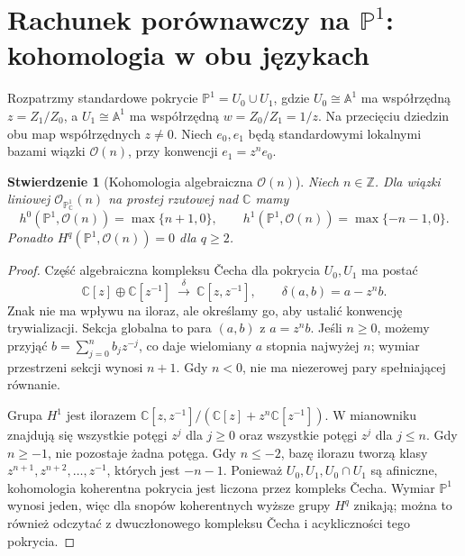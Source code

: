 \documentclass[11pt,a4paper,openany]{report}
\numberwithin{equation}{section}
\theoremstyle{plain}
\newtheorem{stwierdzenie}[twierdzenie]{Stwierdzenie}
\theoremstyle{definition}
\theoremstyle{remark}
\newcommand{\Z}{\mathbb Z}
\newcommand{\C}{\mathbb C}
\newcommand{\A}{\mathbb A}
\newcommand{\PP}{\mathbb P}
\begin{document}
\section[Rachunek porównawczy na P1: kohomologia w obu językach]{Rachunek porównawczy na $\PP^1$: kohomologia w obu językach}
\label{sec:ga9-p1-cech}

Rozpatrzmy standardowe pokrycie $\PP^1=U_0\cup U_1$,
gdzie $U_0\cong\A^1$ ma współrzędną $z=Z_1/Z_0$,
a $U_1\cong\A^1$ ma współrzędną $w=Z_0/Z_1=1/z$.
Na przecięciu dziedzin obu map współrzędnych $z\ne0$.
Niech $e_0,e_1$ będą standardowymi lokalnymi bazami
wiązki $\mathcal O(n)$, przy konwencji $e_1=z^n e_0$.

\begin{stwierdzenie}[Kohomologia algebraiczna $\mathcal O(n)$]
\label{st:ga9-p1-coh}
Niech $n\in\Z$. Dla wiązki liniowej $\mathcal O_{\PP^1_\C}(n)$
na prostej rzutowej nad $\C$ mamy
\[
 h^0(\PP^1,\mathcal O(n))=\max\{n+1,0\},\qquad
 h^1(\PP^1,\mathcal O(n))=\max\{-n-1,0\}.
\]
Ponadto $H^q(\PP^1,\mathcal O(n))=0$ dla $q\ge2$.
\end{stwierdzenie}
\begin{proof}
Część algebraiczna kompleksu Čecha dla pokrycia
$U_0,U_1$ ma postać
\[
 \C[z]\oplus\C[z^{-1}]
 \ \xrightarrow{\ \delta\ }\ \C[z,z^{-1}],\qquad
 \delta(a,b)=a-z^n b.
\]
Znak nie ma wpływu na iloraz, ale określamy go,
aby ustalić konwencję trywializacji. Sekcja globalna
to para $(a,b)$ z $a=z^n b$. Jeśli $n\ge0$,
możemy przyjąć $b=\sum_{j=0}^n b_jz^{-j}$,
co daje wielomiany $a$ stopnia najwyżej $n$;
wymiar przestrzeni sekcji wynosi $n+1$. Gdy $n<0$,
nie ma niezerowej pary spełniającej równanie.

Grupa $H^1$ jest ilorazem
$\C[z,z^{-1}]/(\C[z]+z^n\C[z^{-1}])$.
W mianowniku znajdują się wszystkie potęgi $z^j$
dla $j\ge0$ oraz wszystkie potęgi $z^j$ dla $j\le n$.
Gdy $n\ge-1$, nie pozostaje żadna potęga. Gdy
$n\le-2$, bazę ilorazu tworzą klasy
$z^{n+1},z^{n+2},\ldots,z^{-1}$, których jest $-n-1$.
Ponieważ $U_0,U_1,U_0\cap U_1$ są afiniczne,
kohomologia koherentna pokrycia jest liczona
przez kompleks Čecha. Wymiar $\PP^1$ wynosi jeden,
więc dla snopów koherentnych wyższe grupy $H^q$
znikają; można to również odczytać z dwuczłonowego
kompleksu Čecha i acykliczności tego pokrycia.
\end{proof}
\end{document}
